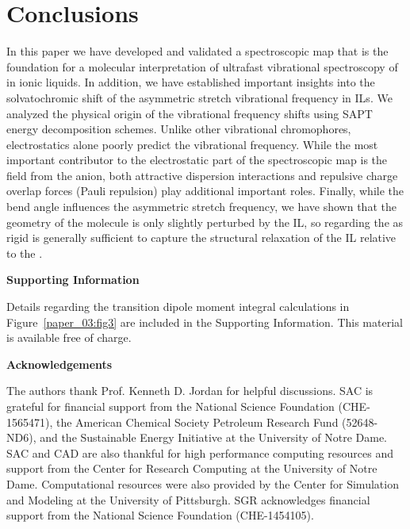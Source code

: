 \section{Conclusions}
\label{paper_03:sec:VI}

In this paper we have developed and validated a spectroscopic map that is the foundation for a molecular interpretation of ultrafast vibrational spectroscopy of  in ionic liquids. In addition, we have established important insights into the solvatochromic shift of the  asymmetric stretch vibrational frequency in ILs. We analyzed the physical origin of the vibrational frequency shifts using SAPT energy decomposition schemes. Unlike other vibrational chromophores, electrostatics alone poorly predict the vibrational frequency. While the most important contributor to the electrostatic part of the spectroscopic map is the field from the anion, both attractive dispersion interactions and repulsive charge overlap forces (Pauli repulsion) play additional important roles. Finally, while the  bend angle influences the asymmetric stretch frequency, we have shown that the geometry of the  molecule is only slightly perturbed by the IL, so regarding the  as rigid is generally sufficient to capture the structural relaxation of the IL relative to the .

\textbf{Supporting Information}

Details regarding the transition dipole moment integral calculations in Figure~\ref{paper_03:fig3} are included in the Supporting Information. This material is available free of charge.

\textbf{Acknowledgements}

The authors thank Prof. Kenneth D. Jordan for helpful discussions. SAC is grateful for financial support from the National Science Foundation (CHE-1565471), the American Chemical Society Petroleum Research Fund (52648-ND6), and the Sustainable Energy Initiative at the University of Notre Dame. SAC and CAD are also thankful for high performance computing resources and support from the Center for Research Computing at the University of Notre Dame. Computational resources were also provided by the Center for Simulation and Modeling at the University of Pittsburgh. SGR acknowledges financial support from the National Science Foundation (CHE-1454105).

